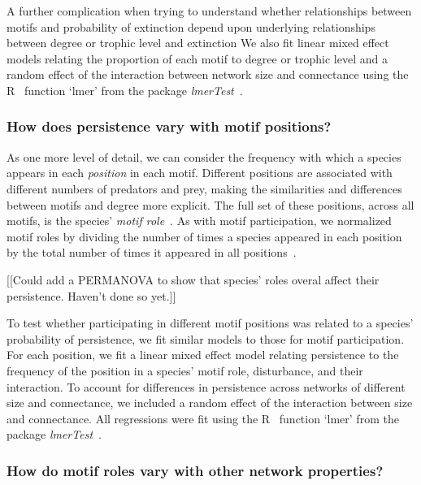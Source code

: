 \documentclass[12pt]{article}
\begin{document}
\begin{spacing}{2.0}
            A further complication when trying to understand whether relationships between motifs and probability of extinction depend upon underlying relationships between degree or trophic level and extinction 
            We also fit linear mixed effect models relating the proportion of each motif to degree or trophic level and a random effect of the interaction between network size and connectance using the R~\citep{R} function `lmer' from the package \emph{lmerTest}~\citep{lmerTest}.

        
        \subsubsection*{How does persistence vary with motif positions?}
        
            As one more level of detail, we can consider the frequency with which a species appears in each \emph{position} in each motif. 
            Different positions are associated with different numbers of predators and prey, making the similarities and differences between motifs and degree more explicit.
            The full set of these positions, across all motifs, is the species' \emph{motif role}~\citep{Stouffer2010,Cirtwill2017}.
            As with motif participation, we normalized motif roles by dividing the number of times a species appeared in each position by the total number of times it appeared in all positions~\citep{Baker2015,Cirtwill2017}.
            
            
            [[Could add a PERMANOVA to show that species' roles overal affect their persistence. Haven't done so yet.]]
            

            To test whether participating in different motif positions was related to a species' probability of persistence, we fit similar models to those for motif participation.
            For each position, we fit a linear mixed effect model relating persistence to the frequency of the position in a species' motif role, disturbance, and their interaction.
            To account for differences in persistence across networks of different size and connectance, we included a random effect of the interaction between size and connectance.
            All regressions were fit using the R~\citep{R} function `lmer' from the package \emph{lmerTest}~\citep{lmerTest}.


        \subsubsection*{How do motif roles vary with other network properties?}
        

\end{spacing}
\end{document}
